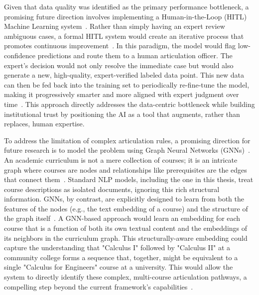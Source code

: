 Given that data quality was identified as the primary performance bottleneck, a promising future direction involves implementing a Human-in-the-Loop (HITL) Machine Learning system~\cite{WU2022364}. Rather than simply having an expert review ambiguous cases, a formal HITL system would create an iterative process that promotes continuous improvement~\cite{10.5555/3061053.3061219,wang2019}. In this paradigm, the model would flag low-confidence predictions and route them to a human articulation officer. The expert's decision would not only resolve the immediate case but would also generate a new, high-quality, expert-verified labeled data point. This new data can then be fed back into the training set to periodically re-fine-tune the model, making it progressively smarter and more aligned with expert judgment over time~\cite{Settles2009ActiveLL,wang2022humanintheloopmachinelearningmacromicro}. This approach directly addresses the data-centric bottleneck while building institutional trust by positioning the AI as a tool that augments, rather than replaces, human expertise.

To address the limitation of complex articulation rules, a promising direction for future research is to model the problem using Graph Neural Networks (GNNs)~\cite{kipf2017semisupervisedclassificationgraphconvolutional, hamilton2018inductiverepresentationlearninglarge}. An academic curriculum is not a mere collection of courses; it is an intricate graph where courses are nodes and relationships like prerequisites are the edges that connect them~\cite{zhang2023curriculum, wang2025generativecontrastiveheterogeneousgraphneural}. Standard NLP models, including the one in this thesis, treat course descriptions as isolated documents, ignoring this rich structural information. GNNs, by contrast, are explicitly designed to learn from both the features of the nodes (e.g., the text embedding of a course) and the structure of the graph itself~\cite{veličković2018graphattentionnetworks, s23084168}. A GNN-based approach would learn an embedding for each course that is a function of both its own textual content and the embeddings of its neighbors in the curriculum graph. This structurally-aware embedding could capture the understanding that "Calculus I" followed by "Calculus II" at a community college forms a sequence that, together, might be equivalent to a single "Calculus for Engineers" course at a university. This would allow the system to directly identify these complex, multi-course articulation pathways, a compelling step beyond the current framework's capabilities~\cite{Yan_2024, zhang2023curriculum}.

